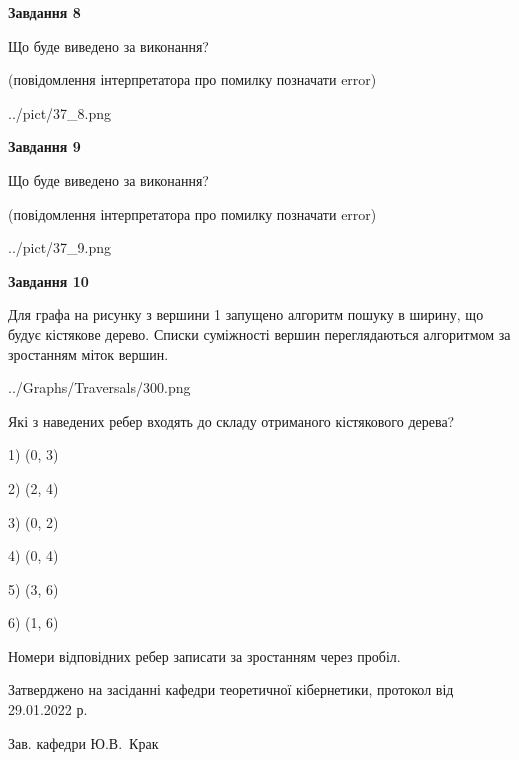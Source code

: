 \documentclass[12pt, ukrainian]{article}
\begin{document}
{\begin {large}
{\begin {center}\textbf{Завдання 8}\end {center}}\par
Що буде виведено за виконання?\par
 (повідомлення інтерпретатора про помилку позначати error)
\begin{center}
	{../pict/37_8.png}
\end{center}
\newpage

{\begin {center}\textbf{Завдання 9}\end {center}}\par
Що буде виведено за виконання?\par
 (повідомлення інтерпретатора про помилку позначати error)\par
\begin{center}
	{../pict/37_9.png}
\end{center}
\newpage

{\begin {center}\textbf{Завдання 10}\end {center}}\par
Для графа на рисунку з вершини 1 запущено алгоритм пошуку в ширину, що будує кістякове дерево. Списки суміжності вершин переглядаються алгоритмом за зростанням міток вершин.\par
\begin{center}
	{../Graphs/Traversals/300.png}
\end{center}
\par Які з наведених ребер входять до складу отриманого кістякового дерева?\par
1) (0, 3)\par
2) (2, 4)\par
3) (0, 2)\par
4) (0, 4)\par
5) (3, 6)\par
6) (1, 6)\par
{\vskip 15pt} Номери відповідних ребер записати за зростанням через пробіл.\par
\newpage


\end {large}
}
{\smallskip \begin {small} Затверджено на засіданні кафедри теоретичної кібернетики, протокол  від   29.01.2022 р.\par\smallskip\smallskip
{\parbox {6.5 cm}{Зав. кафедри \dotfill Ю.В.~Крак}} \end{small}}
\end{document}
